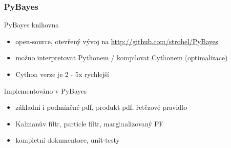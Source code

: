 \documentclass[12pt]{beamer}
\begin{document}
\begin{frame}
	\frametitle{PyBayes}

	\begin{block}{PyBayes knihovna}
		\begin{itemize}
			\item open-source, otevřený vývoj na \url{http://github.com/strohel/PyBayes}
			\item možno interpretovat Pythonem / kompilovat Cythonem (optimalizace)
			\item Cython verze je 2 - 5x rychlejší
		\end{itemize}
	\end{block}

	\begin{block}{Implementováno v PyBayes}
		\begin{itemize}
			\item základní i podmíněné pdf, produkt pdf, řetězové pravidlo
			\item Kalmanův filtr, particle filtr, marginalizovaný PF
			\item kompletní dokumentace, unit-testy
		\end{itemize}
	\end{block}
\end{frame}
\end{document}
